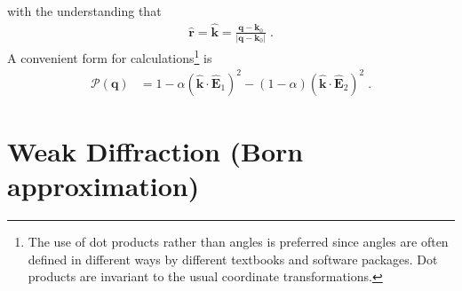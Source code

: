 \documentclass[12pt]{article}
\renewcommand{\vec}[1]{\boldsymbol{#1}}
\newcommand{\hvec}[1]{\hat{\vec{#1}}}
\newcommand{\abs}[1]{\left| #1 \right|}
\begin{document}
with the understanding that 
\begin{align}
 \hvec{r} = \hvec{k} = \frac{\vec{q} - \vec{k}_0}{\abs{\vec{q} - \vec{k}_0}} \;.
\end{align}
A convenient form for calculations\footnote{The use of dot products rather 
than angles is preferred since angles are often defined in different ways by 
different textbooks and software packages.  Dot products are invariant to the 
usual coordinate transformations.} is
\begin{align}
 \mathcal{P}(\vec{q}) &= 1 - \alpha(\hvec{k} \cdot \hvec{E}_1 )^2 - 
(1-\alpha)(\hvec{k} \cdot \hvec{E}_2 )^2 \;.
\end{align}



\section{Weak Diffraction (Born approximation)}
\end{document}
